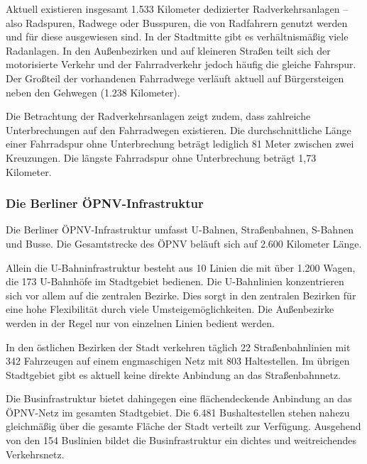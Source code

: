 Aktuell existieren insgesamt 1.533 Kilometer dedizierter Radverkehrsanlagen – also Radspuren, Radwege oder Busspuren, die von Radfahrern genutzt werden und für diese ausgewiesen sind. In der Stadtmitte gibt es verhältnismäßig viele Radanlagen. In den Außenbezirken und auf kleineren Straßen teilt sich der motorisierte Verkehr und der Fahrradverkehr jedoch häufig die gleiche Fahrspur. Der Großteil der vorhandenen Fahrradwege verläuft aktuell auf Bürgersteigen neben den Gehwegen (1.238 Kilometer).


Die Betrachtung der Radverkehrsanlagen zeigt zudem, dass zahlreiche Unterbrechungen auf den Fahrradwegen existieren. Die durchschnittliche Länge einer Fahrradspur ohne Unterbrechung beträgt lediglich 81 Meter zwischen zwei Kreuzungen. Die längste Fahrradspur ohne Unterbrechung beträgt 1,73 Kilometer.

\subsubsection{Die Berliner ÖPNV-Infrastruktur}

Die Berliner ÖPNV-Infrastruktur umfasst U-Bahnen, Straßenbahnen, S-Bahnen und Busse. Die Gesamtstrecke des ÖPNV beläuft sich auf 2.600 Kilometer Länge.


Allein die U-Bahninfrastruktur besteht aus 10 Linien die mit über 1.200 Wagen, die 173 U-Bahnhöfe im Stadtgebiet bedienen. Die U-Bahnlinien konzentrieren sich vor allem auf die zentralen Bezirke. Dies sorgt in den zentralen Bezirken für eine hohe Flexibilität durch viele Umsteigemöglichkeiten. Die Außenbezirke werden in der Regel nur von einzelnen Linien bedient werden.

In den östlichen Bezirken der Stadt verkehren täglich 22 Straßenbahnlinien mit 342 Fahrzeugen auf einem engmaschigen Netz mit 803 Haltestellen. Im übrigen Stadtgebiet gibt es aktuell keine direkte Anbindung an das Straßenbahnnetz.

Die Businfrastruktur bietet dahingegen eine flächendeckende Anbindung an das ÖPNV-Netz im gesamten Stadtgebiet. Die 6.481 Bushaltestellen stehen nahezu gleichmäßig über die gesamte Fläche der Stadt verteilt zur Verfügung. Ausgehend von den 154 Buslinien bildet die Businfrastruktur ein dichtes und weitreichendes Verkehrsnetz.


